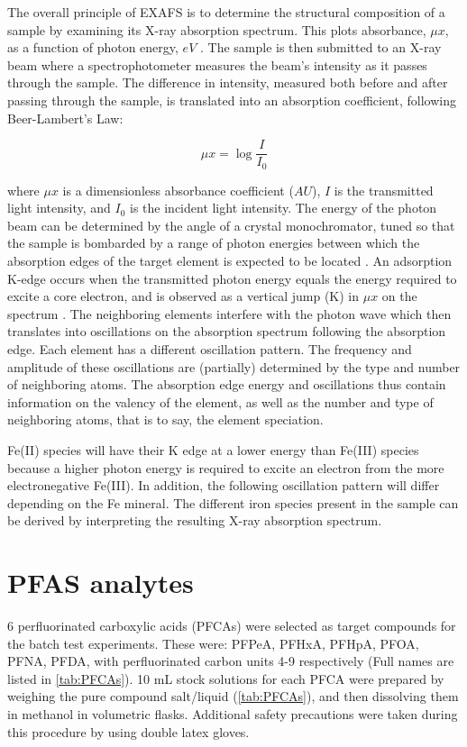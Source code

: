 The overall principle of EXAFS is to determine the structural composition of a sample by examining its X-ray absorption spectrum. This plots absorbance, $\mu x$, as a function of photon energy, $eV$ \citep{vlaica2004exafs}. The sample is then submitted to an X-ray beam where a spectrophotometer measures the beam's intensity as it passes through the sample. The difference in intensity, measured both before and after passing through the sample, is translated into an absorption coefficient, following Beer-Lambert's Law: 

\begin{equation}\label{eq:absorbance}
    \mu x = \log \frac{I}{I_0}
\end{equation}

where $\mu x$ is a dimensionless absorbance coefficient ($AU$), $I$ is the transmitted light intensity, and $I_0$ is the incident light intensity. The energy of the photon beam can be determined by the angle of a crystal monochromator, tuned so that the sample is bombarded by a range of photon energies between which the absorption edges of the target element is expected to be located \citep{vlaica2004exafs}. An adsorption K-edge occurs when the transmitted photon energy equals the energy required to excite a core electron, and is observed as a vertical jump (K) in $\mu x$ on the spectrum \citep{vlaica2004exafs}. The neighboring elements interfere with the photon wave which then translates into oscillations on the absorption spectrum following the absorption edge. Each element has a different oscillation pattern. The frequency and amplitude of these oscillations are (partially) determined by the type and number of neighboring atoms. The absorption edge energy and oscillations thus contain information on the valency of the element, as well as the number and type of neighboring atoms, that is to say, the element speciation.

Fe(II) species will have their K edge at a lower energy than Fe(III) species because a higher photon energy is required to excite an electron from the more electronegative Fe(III). In addition, the following oscillation pattern will differ depending on the Fe mineral. The different iron species present in the sample can be derived by interpreting the resulting X-ray absorption spectrum.


\section{PFAS analytes}\label{sec:PFCAanalytic}
6 perfluorinated carboxylic acids (PFCAs) were selected as target compounds for the batch test experiments. These were: \acrshort{PFPeA}, \acrshort{PFHxA}, \acrshort{PFHpA}, \acrshort{PFOA}, \acrshort{PFNA}, \acrshort{PFDA}, with perfluorinated carbon units 4-9 respectively (Full names are listed in \cref{tab:PFCAs}). 10 mL stock solutions for each PFCA were prepared by weighing the pure compound salt/liquid (\cref{tab:PFCAs}), and then dissolving them in methanol in volumetric flasks. Additional safety precautions were taken during this procedure by using double latex gloves. 


